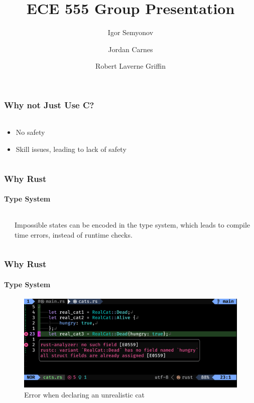 \documentclass[aspectratio=169]{beamer}
\title[Short Title]{
    ECE 555 Group Presentation
}
\author{
	Igor Semyonov
	\and Jordan Carnes
	\and Robert Laverne Griffin
}
\institute{
    George Macon University, Department of Electrical and Computer Engineering
}
\begin{document}
\begin{frame}
	\vspace{-1.8cm}
	\titlepage
\end{frame}

\begin{frame}
	\frametitle{Why not Just Use C?}
	\framesubtitle{}

    \begin{columns}
        \begin{column}{0.4\textwidth}
            \begin{itemize}
                \item No safety
                \item Skill issues, leading to lack of safety
            \end{itemize}
        \end{column}
    \end{columns}
\end{frame}

\begin{frame}
	\frametitle{Why Rust}
	\framesubtitle{Type System}

	\begin{columns}
		\begin{column}{0.4\textwidth}
			
		\end{column}
		\begin{column}{0.5\textwidth}
			Impossible states can be encoded in the type system, which leads to compile time errors, instead of runtime checks.
			
		\end{column}
	\end{columns}
\end{frame}

\begin{frame}
	\frametitle{Why Rust}
	\framesubtitle{Type System}
	\begin{figure}[ht]
		\centering
		\includegraphics[width=\textwidth]{./figures/real-cat.png}
		\caption{Error when declaring an unrealistic cat}
	\end{figure}
\end{frame}
\end{document}
